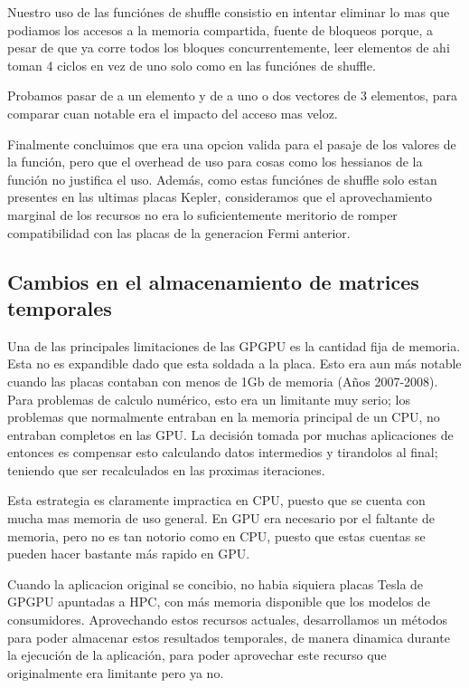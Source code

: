 Nuestro uso de las funci\'ones de shuffle consistio en intentar eliminar lo mas que podiamos
los accesos a la memoria compartida, fuente de bloqueos porque, a pesar de que ya corre
todos los bloques concurrentemente, leer elementos de ahi toman 4 ciclos en vez de uno solo
como en las funci\'ones de shuffle.

Probamos pasar de a un elemento y de a uno o dos vectores de 3 elementos, para comparar
cuan notable era el impacto del acceso mas veloz.

Finalmente concluimos que era una opcion valida para el pasaje de los valores de la funci\'on,
pero que el overhead de uso para cosas como los hessianos de la funci\'on no justifica el uso.
Adem\'as, como estas funci\'ones de shuffle solo estan presentes en las ultimas placas Kepler,
consideramos que el aprovechamiento marginal de los recursos no era lo suficientemente meritorio
de romper compatibilidad con las placas de la generacion Fermi anterior.


\subsection{Cambios en el almacenamiento de matrices temporales}
Una de las principales limitaciones de las GPGPU es la cantidad fija de memoria. Esta no es
expandible dado que esta soldada a la placa. Esto era aun m\'as notable cuando las placas
contaban con menos de 1Gb de memoria (A\~nos 2007-2008).
Para problemas de calculo num\'erico, esto era un limitante muy serio; los problemas que
normalmente entraban en la memoria principal de un CPU, no entraban completos en las GPU.
La decisi\'on tomada por muchas aplicaciones de entonces es compensar esto calculando
datos intermedios y tirandolos al final; teniendo que ser recalculados en las proximas iteraciones.

Esta estrategia es claramente impractica en CPU, puesto que se cuenta con mucha mas memoria
de uso general. En GPU era necesario por el faltante de memoria, pero no es tan notorio como en CPU,
puesto que estas cuentas se pueden hacer bastante m\'as rapido en GPU.

Cuando la aplicacion original se concibio, no habia siquiera placas Tesla de GPGPU apuntadas a HPC, con
m\'as memoria disponible que los modelos de consumidores. Aprovechando estos recursos actuales,
desarrollamos un m\'etodos para poder almacenar estos resultados temporales, de manera dinamica
durante la ejecuci\'on de la aplicaci\'on, para poder aprovechar este recurso que originalmente
era limitante pero ya no.


